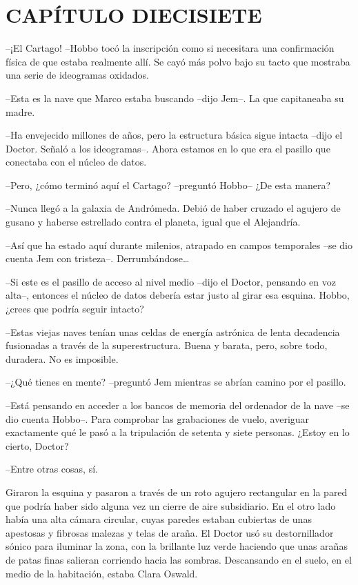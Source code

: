 \chapter*{CAPÍTULO DIECISIETE}

{--¡El Cartago! --Hobbo tocó la inscripción como si necesitara una
 confirmación física de que estaba realmente allí. Se cayó más polvo bajo
su tacto que mostraba una serie de ideogramas oxidados.}

{--Esta es la nave que Marco estaba buscando --dijo Jem--. La que
capitaneaba su madre.}

{--Ha envejecido millones de años, pero la estructura básica sigue
 intacta --dijo el Doctor. Señaló a los ideogramas--. Ahora estamos en lo
que era el pasillo que conectaba con el núcleo de datos.}

{--Pero, ¿cómo terminó aquí el Cartago? --preguntó Hobbo-- ¿De esta
manera?}

{--Nunca llegó a la galaxia de Andrómeda. Debió de haber cruzado el
 agujero de gusano y haberse estrellado contra el planeta, igual que el
Alejandría.}

{--Así que ha estado aquí durante milenios, atrapado en campos temporales
 --se dio cuenta Jem con tristeza--. Derrumbándose\ldots{}}

{--Si este es el pasillo de acceso al nivel medio --dijo el Doctor,
 pensando en voz alta--, entonces el núcleo de datos debería estar justo
al girar esa esquina. Hobbo, ¿crees que podría seguir intacto?}

{--Estas viejas naves tenían unas celdas de energía astrónica de lenta
 decadencia fusionadas a través de la superestructura. Buena y barata,
pero, sobre todo, duradera. No es imposible.}

{--¿Qué tienes en mente? --preguntó Jem mientras se abrían camino por el
pasillo.}

{--Está pensando en acceder a los bancos de memoria del ordenador de la
 nave --se dio cuenta Hobbo--. Para comprobar las grabaciones de vuelo,
 averiguar exactamente qué le pasó a la tripulación de setenta y siete
personas. ¿Estoy en lo cierto, Doctor?}

{--Entre otras cosas, sí.}

{Giraron la esquina y pasaron a través de un roto agujero rectangular en
 la pared que podría haber sido alguna vez un cierre de aire subsidiario.
 En el otro lado había una alta cámara circular, cuyas paredes estaban
 cubiertas de unas apestosas y fibrosas malezas y telas de araña. El
 Doctor usó su destornillador sónico para iluminar la zona, con la
 brillante luz verde haciendo que unas arañas de patas finas salieran
 corriendo hacia las sombras. Descansando en el suelo, en el medio de la
habitación, estaba Clara Oswald.}

